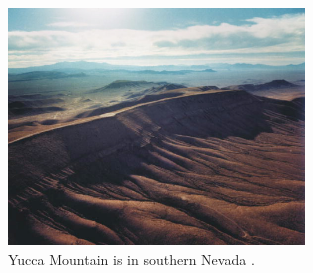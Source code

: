 \begin{figure}[htbp!]
  \begin{center}
    \includegraphics[width=0.7\textwidth]{yucca_site.eps}
  \end{center}
  \caption{Yucca Mountain is in southern Nevada \cite{omb_yucca_2006}.}
  \label{fig:yucca_site}
\end{figure}
